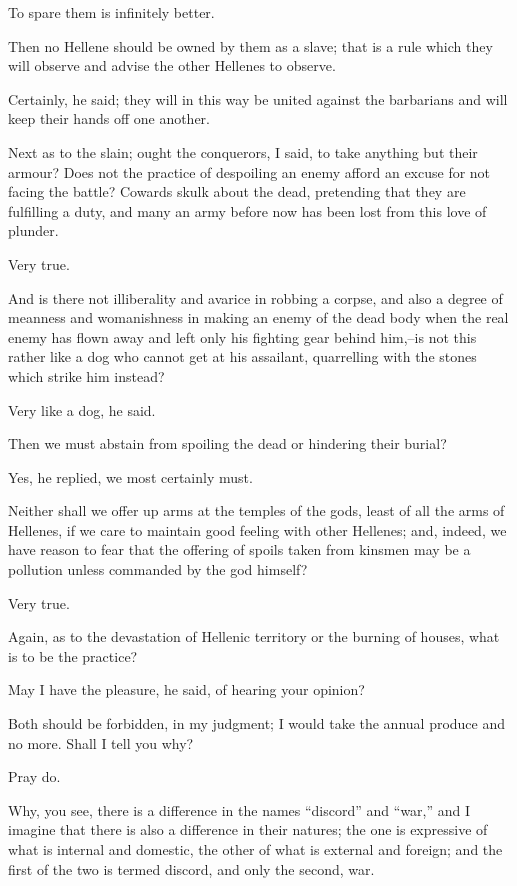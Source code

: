 To spare them is infinitely better.

Then no Hellene should be owned by them as a slave; that is a rule which
they will observe and advise the other Hellenes to observe.

Certainly, he said; they will in this way be united against the
barbarians and will keep their hands off one another.

Next as to the slain; ought the conquerors, I said, to take anything
but their armour? Does not the practice of despoiling an enemy afford
an excuse for not facing the battle? Cowards skulk about the dead,
pretending that they are fulfilling a duty, and many an army before now
has been lost from this love of plunder.

Very true.

And is there not illiberality and avarice in robbing a corpse, and also
a degree of meanness and womanishness in making an enemy of the dead
body when the real enemy has flown away and left only his fighting
gear behind him,--is not this rather like a dog who cannot get at his
assailant, quarrelling with the stones which strike him instead?

Very like a dog, he said.

Then we must abstain from spoiling the dead or hindering their burial?

Yes, he replied, we most certainly must.

Neither shall we offer up arms at the temples of the gods, least of all
the arms of Hellenes, if we care to maintain good feeling with other
Hellenes; and, indeed, we have reason to fear that the offering of
spoils taken from kinsmen may be a pollution unless commanded by the god
himself?

Very true.

Again, as to the devastation of Hellenic territory or the burning of
houses, what is to be the practice?

May I have the pleasure, he said, of hearing your opinion?

Both should be forbidden, in my judgment; I would take the annual
produce and no more. Shall I tell you why?

Pray do.

Why, you see, there is a difference in the names ``discord'' and ``war,''
and I imagine that there is also a difference in their natures; the one
is expressive of what is internal and domestic, the other of what is
external and foreign; and the first of the two is termed discord, and
only the second, war.

